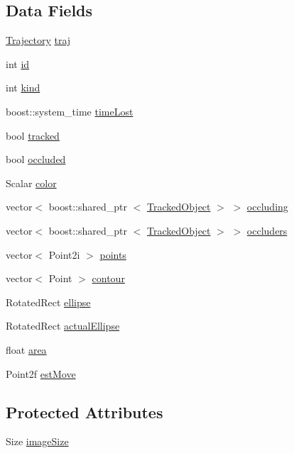 \subsection*{\-Data \-Fields}
\begin{DoxyCompactItemize}
\item 
\hyperlink{classTrajectory}{\-Trajectory} \hyperlink{classTrackedObject_af6389ff5ac6cebc354b163a9e6eda07a}{traj}
\item 
int \hyperlink{classTrackedObject_aea79584b098d4c0d0d95412b5f42e3f7}{id}
\item 
int \hyperlink{classTrackedObject_a6c114f46a4b9bab567e4c4fa04041b62}{kind}
\item 
boost\-::system\-\_\-time \hyperlink{classTrackedObject_a3802fb99c733a1e827023abac9faf5cf}{time\-Lost}
\item 
bool \hyperlink{classTrackedObject_ac1c0ae4b925aff1f5a373fb2464e61ab}{tracked}
\item 
bool \hyperlink{classTrackedObject_a0751a5e43e900dbcd45a461d52ce0b0a}{occluded}
\item 
\-Scalar \hyperlink{classTrackedObject_ab9dde7b9f0950f5163a91d3d3e85c6dd}{color}
\item 
vector$<$ boost\-::shared\-\_\-ptr\*
$<$ \hyperlink{classTrackedObject}{\-Tracked\-Object} $>$ $>$ \hyperlink{classTrackedObject_a481b19fee484951eec8fcd924bf80ef2}{occluding}
\item 
vector$<$ boost\-::shared\-\_\-ptr\*
$<$ \hyperlink{classTrackedObject}{\-Tracked\-Object} $>$ $>$ \hyperlink{classTrackedObject_a01c84685f2934e13e75a056df18ee5ef}{occluders}
\item 
vector$<$ \-Point2i $>$ \hyperlink{classTrackedObject_a4b7ea017a2a164eff41c149610be0066}{points}
\item 
vector$<$ \-Point $>$ \hyperlink{classTrackedObject_af78a0e96f31725cd9b077d500bf69b16}{contour}
\item 
\-Rotated\-Rect \hyperlink{classTrackedObject_aad5c268ab9a03db41513688274f4fb2f}{ellipse}
\item 
\-Rotated\-Rect \hyperlink{classTrackedObject_a54d5e50d62b023db933ac503a69311e4}{actual\-Ellipse}
\item 
float \hyperlink{classTrackedObject_a493a4f03e1560337d4359f42ccdbb6c2}{area}
\item 
\-Point2f \hyperlink{classTrackedObject_a65278da70214b4cdce952b9a56b3a100}{est\-Move}
\end{DoxyCompactItemize}
\subsection*{\-Protected \-Attributes}
\begin{DoxyCompactItemize}
\item 
\-Size \hyperlink{classTrackedObject_a0d590ee8d843796c1341575f92f1565f}{image\-Size}
\end{DoxyCompactItemize}


